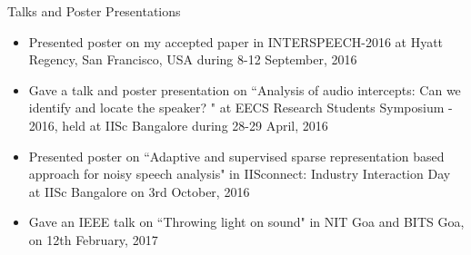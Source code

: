 \documentclass[10pt]{article}
\begin{document}
\begin{cv}
\begin{cvlist}{Talks and Poster Presentations}
\begin{itemize}
\item 
Presented poster on my accepted paper in INTERSPEECH-2016 at Hyatt Regency, San Francisco, USA during 8-12 September, 2016

\item Gave a talk and poster presentation on ``Analysis of audio intercepts: Can we identify and locate the speaker? " at EECS Research Students Symposium - 2016,  held at IISc Bangalore during 28-29 April, 2016
\item Presented poster on ``Adaptive and supervised sparse representation based approach for noisy speech analysis"  in IISconnect: Industry Interaction Day at IISc  Bangalore on 3rd October, 2016 
\item Gave an IEEE talk on ``Throwing light on sound" in NIT Goa and BITS Goa, on 12th February, 2017
\end{itemize}
\end{cvlist}


\end{cv}
\end{document}
